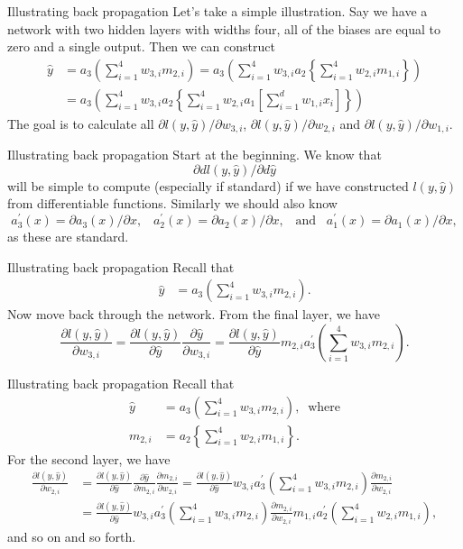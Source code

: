 \documentclass{beamer}
\begin{document}
\begin{frame}{Illustrating back propagation}
Let's take a simple illustration. Say we have a network with two hidden layers with widths four, all of the biases are equal to zero and a single output. Then we can construct \begin{align*}
\hat{y}&=a_3\left(\sum^4_{i=1}w_{3,i}m_{2,i}\right)=a_3\left(\sum^4_{i=1}w_{3,i}a_2\left\{\sum^4_{i=1}w_{2,i}m_{1,i}\right\}\right)\\
&=a_3\left(\sum^4_{i=1}w_{3,i}a_2\left\{\sum^4_{i=1}w_{2,i}a_1\left[\sum^d_{i=1}w_{1,i}x_i\right]\right\}\right)
\end{align*}
The goal is to calculate all $\partial l(y,\hat{y})/\partial w_{3,i}$, $\partial l(y,\hat{y})/\partial w_{2,i}$ and $\partial l(y,\hat{y})/\partial w_{1,i}$.
\end{frame}
\begin{frame}{Illustrating back propagation}
Start at the beginning. We know that
\[
\partial{d} l(y,\hat{y}) / \partial{d}\hat{y}
\] 
will be simple to compute (especially if standard) if we have constructed $l(y,\hat{y}) $ from differentiable functions. Similarly we should also know
\[
a_3^{'}(x)=\partial a_3(x)/\partial x,\;\;\; a_2^{'}(x)=\partial a_2(x)/\partial x,\;\;\;\text{and} \;\;\;a_1^{'}(x)=\partial a_1(x)/\partial x,
\]
as these are standard.
\end{frame}
\begin{frame}{Illustrating back propagation}
Recall that  \begin{align*}
\hat{y}&=a_3\left(\sum^4_{i=1}w_{3,i}m_{2,i}\right).
\end{align*}
Now move back through the network. From the final layer, we  have
\[
\frac{\partial l(y,\hat{y})}{\partial w_{3,i}} = \frac{\partial l(y,\hat{y}) }{\partial \hat{y}}\frac{\partial \hat{y} }{\partial w_{3,i}}= \frac{\partial l(y,\hat{y}) }{\partial \hat{y}}m_{2,i}a_3^{'}\left(\sum^4_{i=1}w_{3,i}m_{2,i}\right).
\]
\end{frame}
\begin{frame}{Illustrating back propagation}
Recall that  \begin{align*}
\hat{y}&=a_3\left(\sum^4_{i=1}w_{3,i}m_{2,i}\right),\;\;\text{where}\\
m_{2,i}&=a_2\left\{\sum^4_{i=1}w_{2,i}m_{1,i}\right\}.
\end{align*}
For the second layer, we have
\begin{align*}
\frac{\partial l(y,\hat{y})}{\partial w_{2,i}}& = \frac{\partial l(y,\hat{y}) }{\partial \hat{y}}\frac{\partial \hat{y} }{\partial m_{2,i}}\frac{\partial m_{2,i} }{\partial w_{2,i}}=\frac{\partial l(y,\hat{y}) }{\partial \hat{y}}w_{3,i}a_3^{'}\left(\sum^4_{i=1}w_{3,i}m_{2,i}\right)\frac{\partial m_{2,i} }{\partial w_{2,i}}\\
&=\frac{\partial l(y,\hat{y}) }{\partial \hat{y}}w_{3,i}a_3^{'}\left(\sum^4_{i=1}w_{3,i}m_{2,i}\right)\frac{\partial m_{2,i} }{\partial w_{2,i}}m_{1,i}a_2^{'}\left(\sum^4_{i=1}w_{2,i}m_{1,i}\right),
\end{align*}
and so on and so forth. 
\end{frame}
\end{document}
